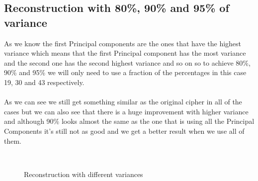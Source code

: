 \documentclass[paper=a4, fontsize=11pt]{scrartcl} %
\begin{document}
\subsection{Reconstruction with 80\%, 90\% and 95\% of variance}
As we know the first Principal components are the ones that have the highest variance which means that the first Principal component has the most variance and the second one has the second highest variance and so on so to achieve 80\%, 90\% and 95\% we will only need to use a fraction of the percentages in this case 19, 30 and 43 respectively.\\\\
As we can see we still get something similar as the original cipher in all of the cases but we can also see that there is a huge improvement with higher variance and although 90\% looks almost the same as the one that is using all the Principal Components it's still not as good and we get a better result when we use all of them.
\clearpage
\begin{figure}[h]
    \centering
	\\
    \caption{Reconstruction with different variances}
    \label{fig:recon}
\end{figure}
\end{document}
